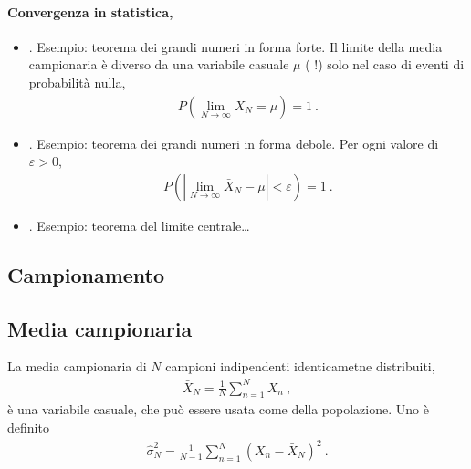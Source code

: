 \documentclass[letterpaper,10pt,italian]{jupyterBook}
\begin{document}
\paragraph{Convergenza in statistica, }
\label{\detokenize{ch/statistics/iid:convergenza-in-statistica-todo}}\begin{itemize}
\item {} 
\sphinxAtStartPar
{}. Esempio: teorema dei grandi numeri in forma forte. Il limite della media campionaria è diverso da una variabile casuale \(\mu\) ( !) solo nel caso di eventi di probabilità nulla,
\begin{equation*}
\begin{split}P\left( \lim_{N \rightarrow \infty} \bar{X}_N = \mu \right) = 1 \ .\end{split}
\end{equation*}
\item {} 
\sphinxAtStartPar
{}. Esempio: teorema dei grandi numeri in forma debole. Per ogni valore di \(\varepsilon > 0\),
\begin{equation*}
\begin{split}P\left( \left|\lim_{N \rightarrow \infty} \bar{X}_N - \mu \right| < \varepsilon \right) = 1 \ .\end{split}
\end{equation*}
\item {} 
\sphinxAtStartPar
{}. Esempio: teorema del limite centrale…

\end{itemize}

\sphinxstepscope


\subsection{Campionamento}
\label{\detokenize{ch/statistics/sampling:campionamento}}\label{\detokenize{ch/statistics/sampling::doc}}

\subsection{Media campionaria}
\label{\detokenize{ch/statistics/sampling:media-campionaria}}
\sphinxAtStartPar
La media campionaria di \(N\) campioni indipendenti identicametne distribuiti,
\begin{equation*}
\begin{split}\bar{X}_N = \frac{1}{N} \sum_{n=1}^{N} X_n \ ,\end{split}
\end{equation*}
\sphinxAtStartPar
è una variabile casuale, che può essere usata come  della popolazione. Uno  è definito
\begin{equation*}
\begin{split}\hat{\sigma}^2_N = \frac{1}{N-1} \sum_{n=1}^N (X_n - \bar{X}_N)^2 \ .\end{split}
\end{equation*}
\end{document}
